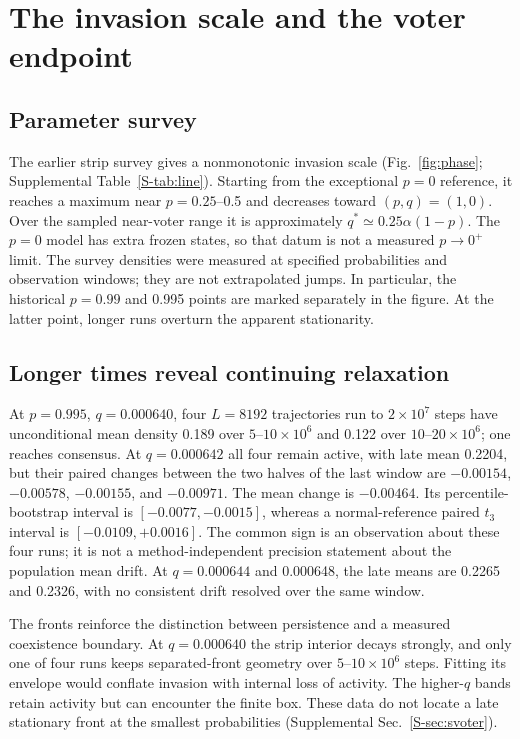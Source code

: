 \section{The invasion scale and the voter endpoint}
\label{sec:line}
\subsection{Parameter survey}
\label{sec:phase}

The earlier strip survey gives a nonmonotonic invasion scale
(Fig.~\ref{fig:phase}; Supplemental Table~\ref{S-tab:line}). Starting
from the exceptional $p=0$ reference, it reaches a maximum near
$p=0.25$--0.5 and decreases toward $(p,q)=(1,0)$.
Over the sampled near-voter range it is approximately
$q^*\simeq0.25\alpha(1-p)$. The $p=0$ model has extra frozen states,
so that datum is not a measured $p\to0^+$ limit.
The survey densities were measured at specified probabilities and
observation windows; they are not extrapolated jumps.
In particular, the historical $p=0.99$ and 0.995 points are marked
separately in the figure. At the latter point, longer runs overturn
the apparent stationarity.



\subsection{Longer times reveal continuing relaxation}
\label{sec:voter}

At $p=0.995$, $q=0.000640$, four $L=8192$ trajectories run to
$2\times10^7$ steps have unconditional mean density 0.189 over
$5$--$10\times10^6$ and 0.122 over $10$--$20\times10^6$; one reaches
consensus. At $q=0.000642$ all four remain active, with late mean 0.2204,
but their paired changes between the two halves of the last window are
$-0.00154$, $-0.00578$, $-0.00155$, and $-0.00971$.
The mean change is $-0.00464$. Its percentile-bootstrap interval is
$[-0.0077,-0.0015]$, whereas a normal-reference paired $t_3$ interval
is $[-0.0109,+0.0016]$. The common sign is an observation about these
four runs; it is not a method-independent precision statement about
the population mean drift.
At $q=0.000644$ and 0.000648, the late means are 0.2265 and 0.2326,
with no consistent drift resolved over the same window.



The fronts reinforce the distinction between persistence and a measured
coexistence boundary. At $q=0.000640$ the strip interior decays strongly,
and only one of four runs keeps separated-front geometry over
$5$--$10\times10^6$ steps. Fitting its envelope would conflate invasion
with internal loss of activity. The higher-$q$ bands retain activity but
can encounter the finite box. These data do not locate a late stationary
front at the smallest probabilities (Supplemental Sec.~\ref{S-sec:svoter}).

